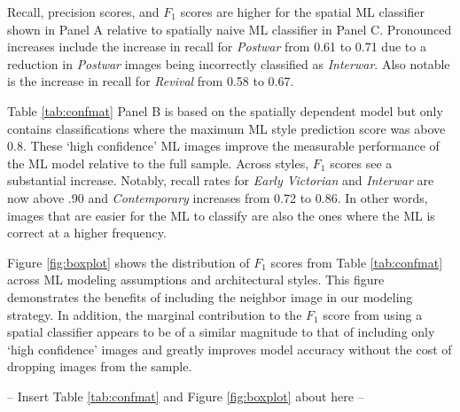 \documentclass[]{article}
\begin{document}
Recall, precision scores, and $F_{1}$ scores are higher for the spatial ML classifier shown in Panel A relative to spatially naive ML classifier in Panel C. Pronounced increases include the increase in recall for \emph{Postwar} from 0.61 to 0.71 due to a reduction in \emph{Postwar} images being incorrectly classified as \emph{Interwar}. Also notable is the increase in recall for \emph{Revival} from 0.58 to 0.67. 

Table \ref{tab:confmat} Panel B is based on the spatially dependent model but only contains classifications where the maximum ML style prediction score was above 0.8. These `high confidence' ML images improve the measurable performance of the ML model relative to the full sample. Across styles, $F_{1}$ scores see a substantial increase. Notably, recall rates for \emph{Early Victorian} and \emph{Interwar} are now above .90 and \emph{Contemporary} increases from 0.72 to 0.86. In other words, images that are easier for the ML to classify are also the ones where the ML is correct at a higher frequency.



Figure \ref{fig:boxplot} shows the distribution of $F_{1}$ scores from Table \ref{tab:confmat} across ML modeling assumptions and architectural styles. This figure demonstrates the benefits of including the neighbor image in our modeling strategy. In addition, the marginal contribution to the $F_{1}$ score from using a spatial classifier appears to be of a similar magnitude to that of including only `high confidence' images and greatly improves model accuracy without the cost of dropping images from the sample.

\begin{center}
  -- Insert Table \ref{tab:confmat} and Figure \ref{fig:boxplot} about here --
\end{center}
\end{document}
